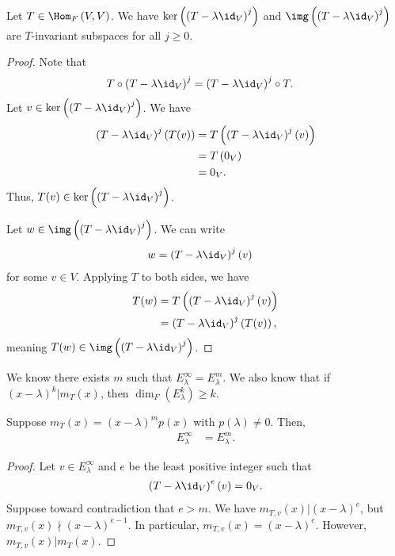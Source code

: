 \documentclass[10pt]{mypackage}
\begin{document}
\begin{lemma}
  Let $T\in \Hom_{F}\left(V,V\right)$. We have $\ker\left(\left(T-\lambda \id_V\right)^j\right)$ and $\img\left(\left(T-\lambda \id_V\right)^j\right)$ are $T$-invariant subspaces for all $j\geq 0$.
\end{lemma}
\begin{proof}
  Note that
  \begin{align*}
    T\circ \left(T - \lambda\id_{V}\right)^j &= \left(T - \lambda\id_{V}\right)^j\circ T.
  \end{align*}
  Let $v\in \ker\left(\left(T-\lambda \id_V\right)^j\right)$. We have
  \begin{align*}
    \left(T-\lambda\id_V\right)^j\left(T(v)\right) &= T\left(\left(T-\lambda\id_V\right)^j(v)\right)\\
                                                   &= T\left(0_V\right)\\
                                                   &= 0_V.
  \end{align*}
  Thus, $T(v)\in \ker\left(\left(T-\lambda\id_V\right)^j\right)$.\newline

  Let $w\in \img\left(\left(T-\lambda\id_V\right)^j\right)$. We can write
  \begin{align*}
    w &= \left(T-\lambda\id_V\right)^j(v)
  \end{align*}
  for some $v\in V$. Applying $T$ to both sides, we have
  \begin{align*}
    T(w) &= T\left(\left(T-\lambda\id_V\right)^j(v)\right)\\
         &= \left(T-\lambda\id_V\right)^j\left(T(v)\right),
  \end{align*}
  meaning $T(w)\in \img\left(\left(T-\lambda\id_V\right)^j\right)$.
\end{proof}
We know there exists $m$ such that $E_{\lambda}^{\infty} = E_{\lambda}^{m}$. We also know that if $\left(x-\lambda\right)^k|m_T(x)$, then $\dim_{F}\left(E_{\lambda}^{k}\right)\geq k$.
\begin{lemma}
  Suppose $m_T(x) = \left(x-\lambda\right)^mp(x)$ with $p\left(\lambda\right)\neq 0$. Then,
  \begin{align*}
    E_{\lambda}^{\infty} &= E_{\lambda}^{m}.
  \end{align*}
\end{lemma}
\begin{proof}
  Let $v\in E_{\lambda}^{\infty}$ and $e$ be the least positive integer such that 
  \begin{align*}
    \left(T-\lambda\id_V\right)^{e}\left(v\right) = 0_V.
  \end{align*}
  Suppose toward contradiction that $e > m$. We have $m_{T,v}(x) | \left(x-\lambda\right)^e$, but $m_{T,v}\left(x\right) \nmid \left(x-\lambda\right)^{e-1}$. In particular, $m_{T,v}(x) = \left(x-\lambda\right)^{e}$. However, $m_{T,v}(x) | m_{T}(x)$.
\end{proof}
\end{document}
